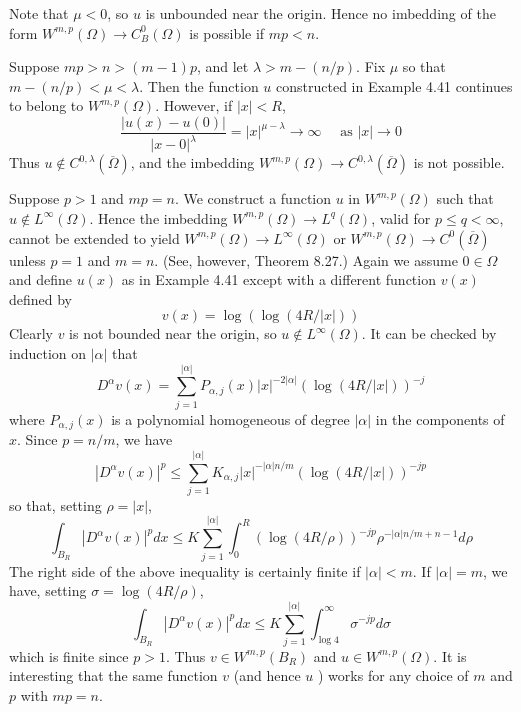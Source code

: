 Note that $\mu<0$, so $u$ is unbounded near the origin. Hence no imbedding of the form $W^{m,p}(\Omega) \rightarrow C_B^0(\Omega)$ is possible if $m p<n$.


\begin{example}
  Suppose $m p>n>(m-1) p$, and let $\lambda>m-(n / p)$. Fix $\mu$ so that $m-(n / p)<\mu<\lambda$. Then the function $u$ constructed in Example 4.41 continues to belong to $W^{m,p}(\Omega)$. However, if $|x|<R$,
  \[
  \frac{|u(x)-u(0)|}{|x-0|^\lambda}=|x|^{\mu-\lambda} \rightarrow \infty \quad \text { as }|x| \rightarrow 0
  \]
  Thus $u \notin C^{0, \lambda}(\overline{\Omega})$, and the imbedding $W^{m,p}(\Omega) \rightarrow C^{0, \lambda}(\overline{\Omega})$ is not possible.
\end{example}

\begin{example}
  Suppose $p>1$ and $m p=n$. We construct a function $u$ in $W^{m,p}(\Omega)$ such that $u \notin L^{\infty}(\Omega)$. Hence the imbedding $W^{m,p}(\Omega) \rightarrow L^q(\Omega)$, valid for $p \leq q<\infty$, cannot be extended to yield $W^{m,p}(\Omega) \rightarrow L^{\infty}(\Omega)$ or $W^{m,p}(\Omega) \rightarrow C^0(\overline{\Omega})$ unless $p=1$ and $m=n$. (See, however, Theorem 8.27.)
  Again we assume $0 \in \Omega$ and define $u(x)$ as in Example 4.41 except with a different function $v(x)$ defined by
  \[
  v(x)=\log (\log (4 R /|x|))
  \]
  Clearly $v$ is not bounded near the origin, so $u \notin L^{\infty}(\Omega)$. It can be checked by induction on $|\alpha|$ that
  \[
  D^\alpha v(x)=\sum_{j=1}^{|\alpha|} P_{\alpha, j}(x)|x|^{-2|\alpha|}(\log (4 R /|x|))^{-j}
  \]
  where $P_{\alpha, j}(x)$ is a polynomial homogeneous of degree $|\alpha|$ in the components of $x$. Since $p=n / m$, we have
  \[
  \left|D^\alpha v(x)\right|^p \leq \sum_{j=1}^{|\alpha|} K_{\alpha, j}|x|^{-|\alpha| n / m}(\log (4 R /|x|))^{-j p}
  \]
  so that, setting $\rho=|x|$,
  \[
  \int_{B_R}\left|D^\alpha v(x)\right|^p d x \leq K \sum_{j=1}^{|\alpha|} \int_0^R(\log (4 R / \rho))^{-j p} \rho^{-|\alpha| n / m+n-1} d \rho
  \]
  The right side of the above inequality is certainly finite if $|\alpha|<m$. If $|\alpha|=m$, we have, setting $\sigma=\log (4 R / \rho)$,
  \[
  \int_{B_R}\left|D^\alpha v(x)\right|^p d x \leq K \sum_{j=1}^{|\alpha|} \int_{\log 4}^{\infty} \sigma^{-j p} d \sigma
  \]
  which is finite since $p>1$. Thus $v \in W^{m,p}\left(B_R\right)$ and $u \in W^{m,p}(\Omega)$.
  It is interesting that the same function $v$ (and hence $u$ ) works for any choice of $m$ and $p$ with $m p=n$.
\end{example}

